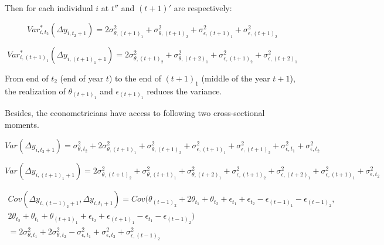 \documentclass[12pt,notitlepage,onecolumn,aps,pra]{revtex4-1}
\begin{document}
Then for each individual \(i\) at \(t''\) and \((t+1)'\) are
respectively:

\begin{equation}
Var^*_{i,t_2}(\Delta y_{i,t_2+1}) =  2\sigma^2_{\theta,(t+1)_1} + \sigma^2_{\theta,(t+1)_2} + \sigma^2_{\epsilon,(t+1)_1} + \sigma^2_{\epsilon,(t+1)_2}
\end{equation}

\begin{equation}
Var^*_{i,(t+1)_1}(\Delta y_{i,(t+1)_1+1}) =  2\sigma^2_{\theta,(t+1)_2} + \sigma^2_{\theta,(t+2)_1} + \sigma^2_{\epsilon,(t+1)_2} + \sigma^2_{\epsilon,(t+2)_1}
\end{equation}

From end of \(t_2\) (end of year \(t\)) to the end of \((t+1)_1\)
(middle of the year \(t+1\)), the realization of \(\theta_{(t+1)_1}\)
and \(\epsilon_{(t+1)_1}\) reduces the variance.

Besides, the econometricians have access to following two
cross-sectional moments.

\begin{equation}
Var (\Delta y_{i,t_2+1}) =  \sigma^2_{\theta,t_2} + 2\sigma^2_{\theta,(t+1)_1} + \sigma^2_{\theta,(t+1)_2} + \sigma^2_{\epsilon,(t+1)_1} + \sigma^2_{\epsilon,(t+1)_2} + \sigma^2_{\epsilon,t_1} + \sigma^2_{\epsilon,t_2} 
\end{equation}

\begin{equation}
Var (\Delta y_{i,(t+1)_1+1}) =  2\sigma^2_{\theta,(t+1)_2} + \sigma^2_{\theta,(t+1)_1} + \sigma^2_{\theta,(t+2)_1} + \sigma^2_{\epsilon,(t+1)_2} + \sigma^2_{\epsilon,(t+2)_1} + \sigma^2_{\epsilon,(t+1)_1} + \sigma^2_{\epsilon,t_2}
\end{equation}

\begin{equation}
\begin{split}
Cov ( \Delta y_{i,(t-1)_2+1},\Delta y_{i,t_1+1}) = Cov(\theta_{(t-1)_2} + 2\theta_{t_1} + \theta_{t_2} + \epsilon_{t_1} + \epsilon_{t_2} - \epsilon_{(t-1)_1} - \epsilon_{(t-1)_2} , \\
2\theta_{t_2} + \theta_{t_1} + \theta_{(t+1)_1} + \epsilon_{t_2} + \epsilon_{(t+1)_1} - \epsilon_{t_1} - \epsilon_{(t-1)_2 } ) \\
= 2\sigma^2_{\theta,t_1} + 2\sigma^2_{\theta,t_2} - \sigma^2_{\epsilon,t_1} + \sigma^2_{\epsilon,t_2} + \sigma^2_{\epsilon,(t-1)_2}
\end{split}
\end{equation}
\end{document}
